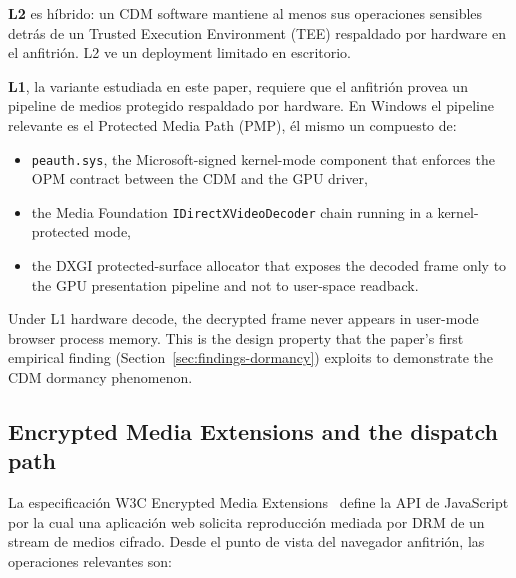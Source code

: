 \documentclass[11pt,letterpaper]{article}
\begin{document}
\textbf{L2} es híbrido: un CDM software mantiene al menos sus
operaciones sensibles detrás de un Trusted Execution Environment
(TEE) respaldado por hardware en el anfitrión. L2 ve un deployment
limitado en escritorio.

\textbf{L1}, la variante estudiada en este paper, requiere que el
anfitrión provea un pipeline de medios protegido respaldado por
hardware. En Windows el pipeline relevante es el Protected Media
Path (PMP), él mismo un compuesto de:

\begin{itemize}[itemsep=0pt,topsep=2pt]
  \item \texttt{peauth.sys}, the Microsoft-signed kernel-mode
        component that enforces the OPM contract between the CDM
        and the GPU driver,
  \item the Media Foundation \texttt{IDirectXVideoDecoder} chain
        running in a kernel-protected mode,
  \item the DXGI protected-surface allocator that exposes the
        decoded frame only to the GPU presentation pipeline and not
        to user-space readback.
\end{itemize}

Under L1 hardware decode, the decrypted frame never appears in
user-mode browser process memory. This is the design property that
the paper's first empirical finding (Section~\ref{sec:findings-dormancy})
exploits to demonstrate the CDM dormancy phenomenon.

\subsection{Encrypted Media Extensions and the dispatch path}
\label{sec:bg-eme}

La especificación W3C Encrypted Media Extensions~\cite{w3c-eme}
define la API de JavaScript por la cual una aplicación web
solicita reproducción mediada por DRM de un stream de medios
cifrado. Desde el punto de vista del navegador anfitrión, las
operaciones relevantes son:
\end{document}
